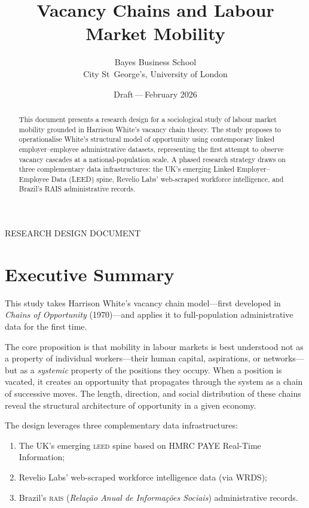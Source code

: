 \documentclass[a4paper]{tufte-handout}
\title{Vacancy Chains and Labour Market Mobility}
\author{%
  Bayes Business School\\
  City St~George's, University of London%
}
\date{Draft\,---\,February 2026}
\begin{document}
\maketitle

\noindent\textcolor{medgray}{\small\textsf{RESEARCH DESIGN DOCUMENT}}\par
\medskip

\begin{abstract}
\noindent
This document presents a research design for a sociological study of labour market mobility grounded in Harrison White's vacancy chain theory.
The study proposes to operationalise White's structural model of opportunity using contemporary linked employer--employee administrative datasets, representing the first attempt to observe vacancy cascades at a national-population scale.
A phased research strategy draws on three complementary data infrastructures: the UK's emerging Linked Employer--Employee Data (LEED) spine, Revelio Labs' web-scraped workforce intelligence, and Brazil's RAIS administrative records.
\end{abstract}

\section{Executive Summary}

This study takes Harrison White's vacancy chain model---first developed in \emph{Chains of Opportunity} (1970)---and applies it to full-population administrative data for the first time.

The core proposition is that mobility in labour markets is best understood not as a property of individual workers---their human capital, aspirations, or networks---but as a \emph{systemic} property of the positions they occupy. When a position is vacated, it creates an opportunity that propagates through the system as a chain of successive moves. The length, direction, and social distribution of these chains reveal the structural architecture of opportunity in a given economy.

The design leverages three complementary data infrastructures:
\begin{enumerate}
  \item The UK's emerging \textsc{leed} spine based on HMRC PAYE Real-Time Information;
  \item Revelio Labs' web-scraped workforce intelligence data (via WRDS);
  \item Brazil's \textsc{rais} (\emph{Relação Anual de Informações Sociais}) administrative records.
\end{enumerate}
\end{document}
